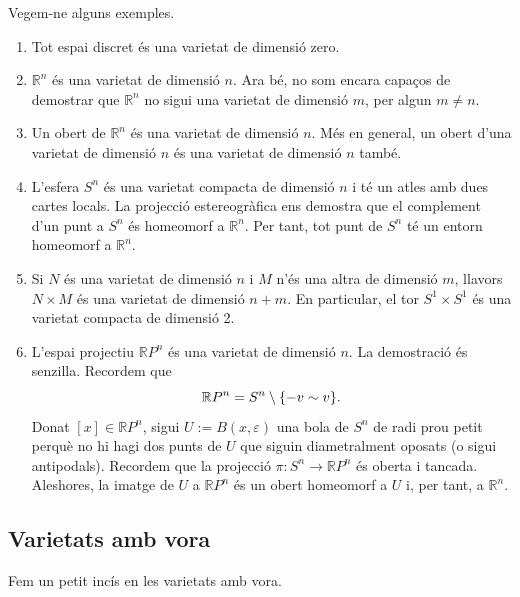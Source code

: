 \documentclass[../main.tex]{subfiles}
\begin{document}
\begin{ej}
\label{ej:varietatstopologiques} Vegem-ne alguns exemples.
\begin{enumerate}[(1)]
    \item Tot espai discret és una varietat de dimensió zero.
    \item $\mathbb{R}^n$ és una varietat de dimensió $n$. Ara bé, no som encara capaços de demostrar que $\mathbb{R}^n$ no sigui una varietat de dimensió $m$, per algun $m\not=n$.
    \item Un obert de $\mathbb{R}^n$ és una varietat de dimensió $n$. Més en general, un obert d'una varietat de dimensió $n$ és una varietat de dimensió $n$ també.
    \item L'esfera $S^n$ és una varietat compacta de dimensió $n$ i té un atles amb dues cartes locals. La projecció estereogràfica ens demostra que el complement d'un punt a $S^n$ és homeomorf a $\mathbb{R}^n$. Per tant, tot punt de $S^n$ té un entorn homeomorf a $\mathbb{R}^n$.
    \item Si $N$ és una varietat de dimensió $n$ i $M$ n'és una altra de dimensió $m$, llavors $N\times M$ és una varietat de dimensió $n+m$. En particular, el tor $S^1\times S^1$ és una varietat compacta de dimensió 2.
    \item L'espai projectiu $\mathbb{R}P^n$ és una varietat de dimensió $n$. La demostració és senzilla. Recordem que
    \begin{equation}
        \notag
        \mathbb{R}P^n = S^n\setminus\{-v\sim v\} .
    \end{equation}
    Donat $[x]\in\mathbb{R}P^n$, sigui $U:=B(x,\varepsilon)$ una bola de $S^n$ de radi prou petit perquè no hi hagi dos punts de $U$ que siguin diametralment oposats (o sigui antipodals). Recordem que la projecció $\pi:S^n\rightarrow \mathbb{R}P^n$ és oberta i tancada. Aleshores, la imatge de $U$ a $\mathbb{R}P^n$ és un obert homeomorf a $U$ i, per tant, a $\mathbb{R}^n$.
\end{enumerate}
\end{ej}


\subsection{Varietats amb vora}

Fem un petit incís en les varietats amb vora.
\end{document}
